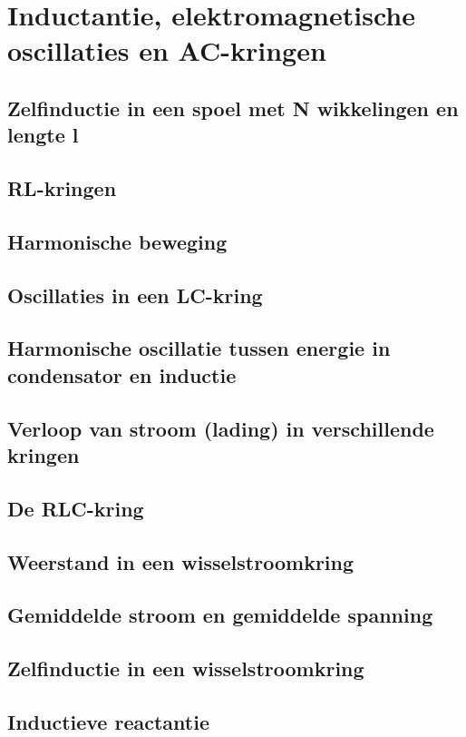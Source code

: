 \documentclass[12pt,a4paper]{article}
\begin{document}
    
    \section{Inductantie, elektromagnetische oscillaties en AC-kringen}
    \subsection{Zelfinductie in een spoel met N wikkelingen en lengte l}
    \subsection{RL-kringen}
    \subsection{Harmonische beweging}
    \subsection{Oscillaties in een LC-kring}
    \subsection{Harmonische oscillatie tussen energie in condensator en inductie}
    \subsection{Verloop van stroom (lading) in verschillende kringen}
    \subsection{De RLC-kring}
    \subsection{Weerstand in een wisselstroomkring}
    \subsection{Gemiddelde stroom en gemiddelde spanning}
    \subsection{Zelfinductie in een wisselstroomkring}
    \subsection{Inductieve reactantie}
\end{document}
